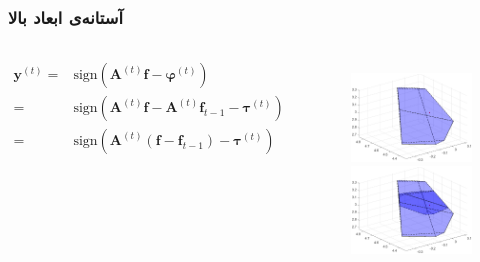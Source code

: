 \begin{frame}
\frametitle{آستانه‌ی ابعاد بالا}
\begin{columns}
\begin{scriptsize}
\begin{align*}
\bm{y}^{(t)}=& \text{sign}\left( \bm{A}^{(t)}\bm{f}- \bm{\varphi}^{(t)}\right) \\
=& \text{sign}\left( \bm{A}^{(t)}\bm{f}- \bm{A}^{(t)}\bm{f}_{t-1}-\bm{\tau}^{(t)}\right) \\
=&\text{sign}\left( \bm{A}^{(t)}\left(\bm{f}-\bm{f}_{t-1}\right)-\bm{\tau}^{(t)}\right)
\end{align*}
\end{scriptsize}
\begin{figure}
    \begin{overprint}
    \includegraphics[scale=0.5]{Images/polyhdr1.eps}
    \includegraphics[scale=0.5]{Images/polyhdr2.eps}

\end{overprint}
\end{figure}
\end{columns}
\end{frame}
